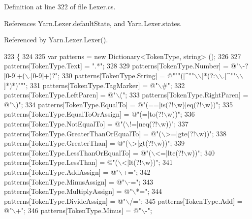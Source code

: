 Definition at line 322 of file Lexer.\-cs.



References Yarn.\-Lexer.\-default\-State, and Yarn.\-Lexer.\-states.



Referenced by Yarn.\-Lexer.\-Lexer().


\begin{DoxyCode}
323         \{
324 
325             var patterns = \textcolor{keyword}{new} Dictionary<TokenType, string> ();
326 
327             patterns[TokenType.Text] = \textcolor{stringliteral}{".*"};
328 
329             patterns[TokenType.Number] = \textcolor{stringliteral}{@"\(\backslash\)-?[0-9]+(\(\backslash\).[0-9]+)?"};
330             patterns[TokenType.String] = \textcolor{stringliteral}{@"""([^""\(\backslash\)\(\backslash\)]*(?:\(\backslash\)\(\backslash\).[^""\(\backslash\)\(\backslash\)]*)*)"""};
331             patterns[TokenType.TagMarker] = \textcolor{stringliteral}{@"\(\backslash\)#"};
332             patterns[TokenType.LeftParen] = \textcolor{stringliteral}{@"\(\backslash\)("};
333             patterns[TokenType.RightParen] = \textcolor{stringliteral}{@"\(\backslash\))"};
334             patterns[TokenType.EqualTo] = \textcolor{stringliteral}{@"(==|is(?!\(\backslash\)w)|eq(?!\(\backslash\)w))"};
335             patterns[TokenType.EqualToOrAssign] = \textcolor{stringliteral}{@"(=|to(?!\(\backslash\)w))"};
336             patterns[TokenType.NotEqualTo] = \textcolor{stringliteral}{@"(\(\backslash\)!=|neq(?!\(\backslash\)w))"};
337             patterns[TokenType.GreaterThanOrEqualTo] = \textcolor{stringliteral}{@"(\(\backslash\)>=|gte(?!\(\backslash\)w))"};
338             patterns[TokenType.GreaterThan] = \textcolor{stringliteral}{@"(\(\backslash\)>|gt(?!\(\backslash\)w))"};
339             patterns[TokenType.LessThanOrEqualTo] = \textcolor{stringliteral}{@"(\(\backslash\)<=|lte(?!\(\backslash\)w))"};
340             patterns[TokenType.LessThan] = \textcolor{stringliteral}{@"(\(\backslash\)<|lt(?!\(\backslash\)w))"};
341             patterns[TokenType.AddAssign] = \textcolor{stringliteral}{@"\(\backslash\)+="};
342             patterns[TokenType.MinusAssign] = \textcolor{stringliteral}{@"\(\backslash\)-="};
343             patterns[TokenType.MultiplyAssign] = \textcolor{stringliteral}{@"\(\backslash\)*="};
344             patterns[TokenType.DivideAssign] = \textcolor{stringliteral}{@"\(\backslash\)/="};
345             patterns[TokenType.Add] = \textcolor{stringliteral}{@"\(\backslash\)+"};
346             patterns[TokenType.Minus] = \textcolor{stringliteral}{@"\(\backslash\)-"};

\end{DoxyCode}
